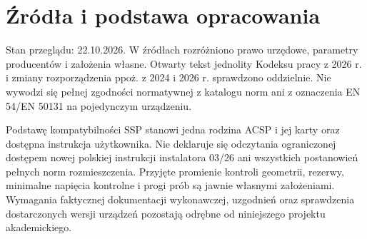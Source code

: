 \section{Źródła i podstawa opracowania}
Stan przeglądu: 22.10.2026. W źródłach rozróżniono prawo urzędowe, parametry producentów i założenia własne. Otwarty tekst jednolity Kodeksu pracy z 2026 r. i zmiany rozporządzenia ppoż. z 2024 i 2026 r. sprawdzono oddzielnie. Nie wywodzi się pełnej zgodności normatywnej z katalogu norm ani z oznaczenia EN 54/EN 50131 na pojedynczym urządzeniu.

Podstawę kompatybilności SSP stanowi jedna rodzina ACSP i jej karty oraz dostępna instrukcja użytkownika. Nie deklaruje się odczytania ograniczonej dostępem nowej polskiej instrukcji instalatora 03/26 ani wszystkich postanowień pełnych norm rozmieszczenia. Przyjęte promienie kontroli geometrii, rezerwy, minimalne napięcia kontrolne i progi prób są jawnie własnymi założeniami. Wymagania faktycznej dokumentacji wykonawczej, uzgodnień oraz sprawdzenia dostarczonych wersji urządzeń pozostają odrębne od niniejszego projektu akademickiego.

\begingroup\small\raggedright

\endgroup
